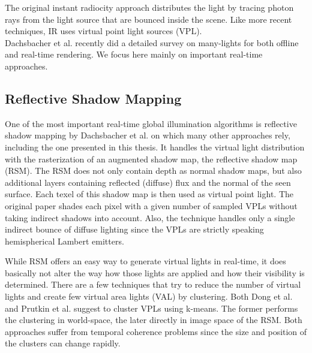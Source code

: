\documentclass[thesis.tex]{subfiles}
\begin{document}
The original instant radiocity approach distributes the light by tracing photon rays from the light source that are bounced inside the scene.
Like more recent techniques, IR uses virtual point light sources (VPL).
\\
Dachsbacher et al. \cite{bib:manylightssurvey2014} recently did a detailed survey on many-lights for both offline and real-time rendering.
We focus here mainly on important real-time approaches.

\subsection{Reflective Shadow Mapping} \label{sec:prev:rsm}
One of the most important real-time global illumination algorithms is reflective shadow mapping by Dachsbacher et al. \cite{bib:reflectiveshadowmaps} on which many other approaches rely, including the one presented in this thesis.
It handles the virtual light distribution with the rasterization of an augmented shadow map, the reflective shadow map (RSM).
The RSM does not only contain depth as normal shadow maps, but also additional layers containing reflected (diffuse) flux and the normal of the seen surface.
Each texel of this shadow map is then used as virtual point light.
The original paper shades each pixel with a given number of sampled VPLs without taking indirect shadows into account.
Also, the technique handles only a single indirect bounce of diffuse lighting since the VPLs are strictly speaking hemispherical Lambert emitters.

While RSM offers an easy way to generate virtual lights in real-time, it does basically not alter the way how those lights are applied and how their visibility is determined.
There are a few techniques that try to reduce the number of virtual lights and create few virtual area lights (VAL) by clustering.
Both Dong et al. \cite{bib:clusturedvisiblity:dong} and Prutkin et al. \cite{bib:clusturedvisiblity:prutkin} suggest to cluster VPLs using k-means.
The former performs the clustering in world-space, the later directly in image space of the RSM.
Both approaches suffer from temporal coherence problems since the size and position of the clusters can change rapidly.
\end{document}
